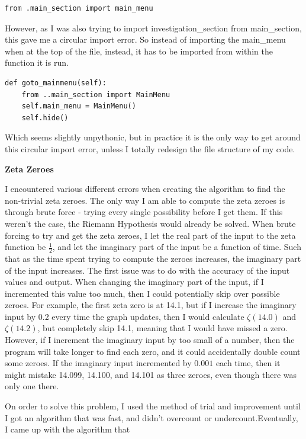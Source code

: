 \documentclass[12pt]{article}
\begin{document}
\begin{lstlisting}
from .main_section import main_menu
\end{lstlisting}

However, as I was also trying to import investigation\_section from main\_section, this gave me a circular import error. So instead of importing the main\_menu when at the top of the file, instead, it has to be imported from within the function it is run.

\begin{lstlisting}
def goto_mainmenu(self):
    from ..main_section import MainMenu
    self.main_menu = MainMenu()
    self.hide()
\end{lstlisting}

Which seems slightly unpythonic, but in practice it is the only way to get around this circular import error, unless I totally redesign the file structure of my code.


\textbf{Zeta Zeroes}

I encountered various different errors when creating the algorithm to find the non-trivial zeta zeroes. The only way I am able to compute the zeta zeroes is through brute force - trying every single possibility before I get them. If this weren't the case, the Riemann Hypothesis would already be solved. When brute forcing to try and get the zeta zeroes, I let the real part of the input to the zeta function be $\frac{1}{2}$, and let the imaginary part of the input be a function of time. Such that as the time spent trying to compute the zeroes increases, the imaginary part of the input increases. The first issue was to do with the accuracy of the input values and output. When changing the imaginary part of the input, if I incremented this value too much, then I could potentially skip over possible zeroes. For example, the first zeta zero is at 14.1, but if I increase the imaginary input by 0.2 every time the graph updates, then I would calculate $\zeta(14.0)$ and $\zeta(14.2)$, but completely skip 14.1, meaning that I would have missed a zero. However, if I increment the imaginary input by too small of a number, then the program will take longer to find each zero, and it could accidentally double count some zeroes. If the imaginary input incremented by $0.001$ each time, then it might mistake 14.099, 14.100, and 14.101 as three zeroes, even though there was only one there.

On order to solve this problem, I used the method of trial and improvement until I got an algorithm that was fast, and didn't overcount or undercount.Eventually, I came up with the algorithm that
\end{document}
